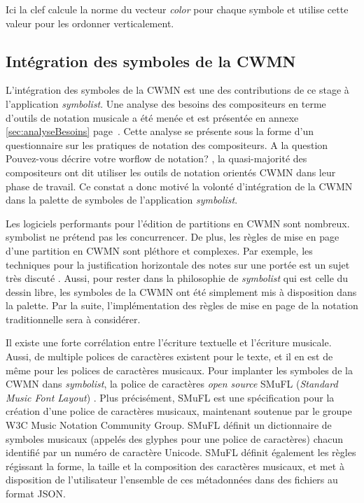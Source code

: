 Ici la clef calcule la norme du vecteur \textit{color} pour chaque symbole et utilise cette valeur pour les ordonner verticalement.


\subsection{Intégration des symboles de la CWMN}
\label{integrationCWMN}
L'intégration des symboles de la CWMN est une des contributions de ce stage à l'application \textit{symbolist}.
Une analyse des besoins des compositeurs en terme d'outils de notation musicale a été menée et est présentée en annexe \ref{sec:analyseBesoins} page~\pageref{sec:analyseBesoins}. Cette analyse se présente sous la forme d'un questionnaire sur les pratiques de notation des compositeurs. A la question \og Pouvez-vous décrire votre worflow de notation? \fg, la quasi-majorité des compositeurs ont dit utiliser les outils de notation orientés CWMN dans leur phase de travail. Ce constat a donc motivé la volonté d'intégration de la CWMN dans la palette de symboles de l'application \textit{symbolist}.

Les logiciels performants pour l'édition de partitions en CWMN sont nombreux. symbolist ne prétend pas les concurrencer. De plus, les règles de mise en page d'une partition en CWMN sont pléthore et complexes. Par exemple, les techniques pour la justification horizontale des notes sur une portée est un sujet très discuté \cite{blostein1991}. Aussi, pour rester dans la philosophie de \textit{symbolist} qui est celle du dessin libre, les symboles de la CWMN ont été simplement mis à disposition dans la palette. Par la suite, l'implémentation des règles de mise en page de la notation traditionnelle sera à considérer.

Il existe une forte corrélation entre l'écriture textuelle et l'écriture musicale. Aussi, de multiple polices de caractères existent pour le texte, et il en est de même pour les polices de caractères musicaux.
Pour implanter les symboles de la CWMN dans \textit{symbolist}, la police de caractères \textit{open source} SMuFL (\textit{Standard Music Font Layout}) \cite{smufl2016}. Plus précisément, SMuFL est une spécification pour la création d'une police de caractères musicaux, maintenant soutenue par le groupe W3C Music Notation Community Group. SMuFL définit un dictionnaire de symboles musicaux (appelés des glyphes pour une police de caractères) chacun identifié par un numéro de caractère Unicode. SMuFL définit également les règles régissant la forme, la taille et la composition des caractères musicaux, et met à disposition de l'utilisateur l'ensemble de ces métadonnées dans des fichiers au format JSON.

